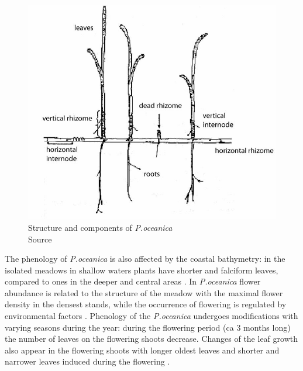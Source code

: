 \documentclass[10pt, a4paper]{article}
\begin{document}
\begin{figure}
	\centering
	\includegraphics[scale=0.15]{Fig-1-8.jpg}
	\caption{Structure and components of \textit{P.oceanica} \\ Source \cite{DiCarlo04}\label{DiCarlo04}}
	\label{fig:8}
\end{figure}

The phenology of \textit{P.oceanica} is also affected by the coastal bathymetry: in the isolated meadows in
shallow waters plants have shorter and falciform leaves, compared to ones in the deeper and central
areas \cite{Dural10}\label{Dural10}. In \textit{P.oceanica} flower abundance is related to the structure of the meadow with
the maximal flower density in the densest stands, while the occurrence of flowering is regulated by
environmental factors \cite{Buia91}\label{Buia91}. Phenology of the \textit{P.oceanica} undergoes 
modifications with varying seasons during the year: during the flowering period (ca 3 months long)
the number of leaves on the flowering shoots decrease. Changes of the leaf growth also appear in the
flowering shoots with longer oldest leaves and shorter and narrower leaves induced during the
flowering \cite{Gobert01}\label{Gobert01}.
\end{document}
